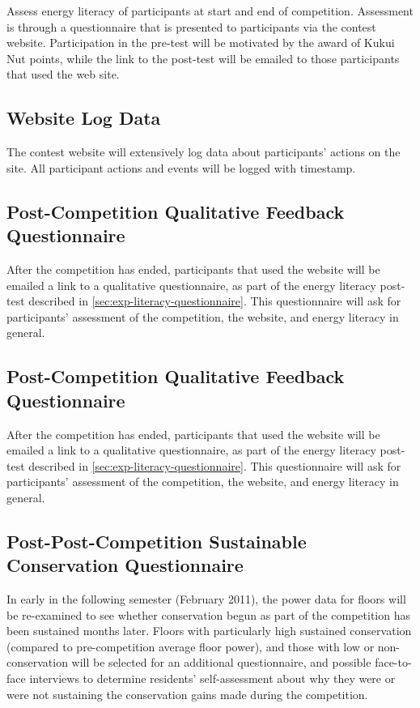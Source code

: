 Assess energy literacy of participants at start and end of competition. Assessment is through a questionnaire that is presented to participants via the contest website. Participation in the pre-test will be motivated by the award of Kukui Nut points, while the link to the post-test will be emailed to those participants that used the web site.

\subsection{Website Log Data}

The contest website will extensively log data about participants' actions on the site. All participant actions and events will be logged with timestamp.

\subsection{Post-Competition Qualitative Feedback Questionnaire}

After the competition has ended, participants that used the website will be emailed a link to a qualitative questionnaire, as part of the energy literacy post-test described in \ref{sec:exp-literacy-questionnaire}. This questionnaire will ask for participants' assessment of the competition, the website, and energy literacy in general.

\subsection{Post-Competition Qualitative Feedback Questionnaire}

After the competition has ended, participants that used the website will be emailed a link to a qualitative questionnaire, as part of the energy literacy post-test described in \ref{sec:exp-literacy-questionnaire}. This questionnaire will ask for participants' assessment of the competition, the website, and energy literacy in general.

\subsection{Post-Post-Competition Sustainable Conservation Questionnaire}

In early in the following semester (February 2011), the power data for floors will be re-examined to see whether conservation begun as part of the competition has been sustained months later. Floors with particularly high sustained conservation (compared to pre-competition average floor power), and those with low or non-conservation will be selected for an additional questionnaire, and possible face-to-face interviews to determine residents' self-assessment about why they were or were not sustaining the conservation gains made during the competition.

